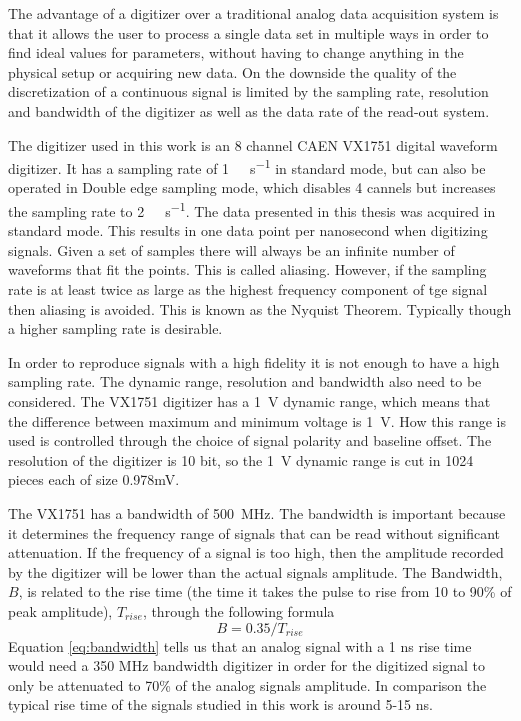 \documentclass[main.tex]{subfiles}
\begin{document}
The advantage of a digitizer over a traditional analog data acquisition system is that it allows the user to process a single data set in multiple ways in order to find ideal values for parameters, without having to change anything in the physical setup or acquiring new data. On the downside the quality of the discretization of a continuous signal is limited by the sampling rate, resolution and bandwidth of the digitizer as well as the data rate of the read-out system.

The digitizer used in this work is an 8 channel CAEN VX1751 digital waveform digitizer. It has a sampling rate of \si{1\giga\sample\per\second} in standard mode, but can also be operated in Double edge sampling mode, which disables 4 cannels but increases the sampling rate to \si{2\giga\sample\per\second}\cite[p.9]{CAEN}. The data presented in this thesis was acquired in standard mode. This results in one data point per nanosecond when digitizing signals. Given a set of samples there will always be an infinite number of waveforms that fit the points\cite{Spectrum}. This is called aliasing. However, if the sampling rate is at least twice as large as the highest frequency component of tge signal then aliasing is avoided. This is known as the Nyquist Theorem. Typically though a higher sampling rate is desirable.

In order to reproduce signals with a high fidelity it is not enough to have a high sampling rate. The dynamic range, resolution and bandwidth also need to be considered. The VX1751 digitizer has a \si{1\volt} dynamic range, which means that the difference between maximum and minimum voltage is \si{1\volt}. How this range is used is controlled through the choice of signal polarity and baseline offset. The resolution of the digitizer is 10 bit, so the \si{1\volt} dynamic range is cut in 1024 pieces each of size 0.978\si{\milli\volt}\cite{CAEN}. 

The VX1751 has a bandwidth of \si{500 \mega\hertz}. The bandwidth is important because it determines the frequency range of signals that can be read without significant attenuation. If the frequency of a signal is too high, then the amplitude recorded by the digitizer will be lower than the actual signals amplitude. The Bandwidth, $B$, is related to the rise time (the time it takes the pulse to rise from 10 to 90\% of peak amplitude), $T_{rise}$, through the following formula\cite[p.354]{Leo}
\begin{equation}
\label{eq:bandwidth}
B=0.35/T_{rise}
\end{equation}
Equation \ref{eq:bandwidth} tells us that an analog signal with a 1 ns rise time would need a 350 MHz bandwidth digitizer in order for the digitized signal to only be attenuated to 70\% of the analog signals amplitude. In comparison the typical rise time of the signals studied in this work is around 5-15 ns.
\end{document}
